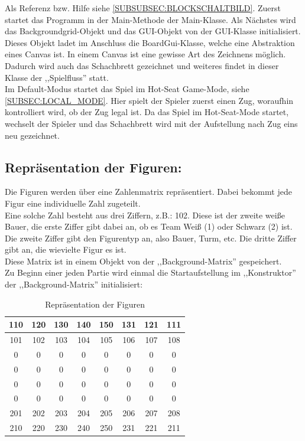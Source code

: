 \documentclass[12pt,a4paper]{article}
\newcommand{\cmnt}[1]{}			%
\begin{document}
\cmnt{Hier soll erklärt werden wie JavaChess initialisiert wird.}

Als Referenz bzw. Hilfe siehe \ref{SUBSUBSEC:BLOCKSCHALTBILD}.
Zuerst startet das Programm in der Main-Methode der Main-Klasse. Als Nächstes wird das Backgroundgrid-Objekt und das GUI-Objekt von der GUI-Klasse initialisiert. \\
Dieses Objekt ladet im Anschluss die BoardGui-Klasse, welche eine Abstraktion eines Canvas ist. In einem Canvas ist eine gewisse Art des Zeichnens möglich. Dadurch wird auch das Schachbrett gezeichnet und weiteres findet in dieser Klasse der ,,Spielfluss'' statt. \\ 
Im Default-Modus startet das Spiel im Hot-Seat Game-Mode, siehe \ref{SUBSEC:LOCAL_MODE}. Hier spielt der Spieler zuerst einen Zug, woraufhin kontrolliert wird, ob der Zug legal ist. Da das Spiel im Hot-Seat-Mode startet, wechselt der Spieler und das Schachbrett wird mit der Aufstellung nach Zug eins neu gezeichnet.

\subsection{Repräsentation der Figuren:}

Die Figuren werden über eine Zahlenmatrix repräsentiert. Dabei bekommt jede Figur eine individuelle Zahl zugeteilt. \\
Eine solche Zahl besteht aus drei Ziffern, z.B.: 102. Diese ist der zweite weiße Bauer, die erste Ziffer gibt dabei an, ob es Team Weiß (1) oder Schwarz (2) ist. Die zweite Ziffer gibt den Figurentyp an, also Bauer, Turm, etc. Die dritte Ziffer gibt an, die wievielte Figur es ist. \\
Diese Matrix ist in einem Objekt von der ,,Background-Matrix'' gespeichert. \\
Zu Beginn einer jeden Partie wird einmal die Startaufstellung im ,,Konstruktor'' der ,,Background-Matrix'' initialisiert:

	\begin{table}[H]
		\centering
		\begin{tabular}{| c | c | c | c | c | c | c | c |}
			\hline
			110 & 120 	& 	130 & 140 	& 150 	& 131 	& 121 	& 	111 \\ \hline
			101 & 102 	& 	103 & 	104 & 	105 & 	106 & 	107 & 	108 \\ \hline
			0	&	0	& 	0	&	0	&	0	&	0	&	0	&	0	\\ \hline
			0	&	0	& 	0	&	0	&	0	&	0	&	0	&	0 	\\ \hline
			0	&	0	& 	0	&	0	&	0	&	0	&	0	&	0 	\\ \hline
			0	&	0	& 	0	&	0	&	0	&	0	&	0	&	0 	\\ \hline
			201 &	202 &	203	&	204	&	205	&	206	&	207	&	208	\\ \hline
			210 & 	220	&	230	&	240	&	250	&	231	&	221	&	211 \\ 
			\hline	
		\end{tabular}
		\caption{Repräsentation der Figuren}
		\label{TABLE:REPRESENTATION-MEEPLES}
	\end{table}
\end{document}
